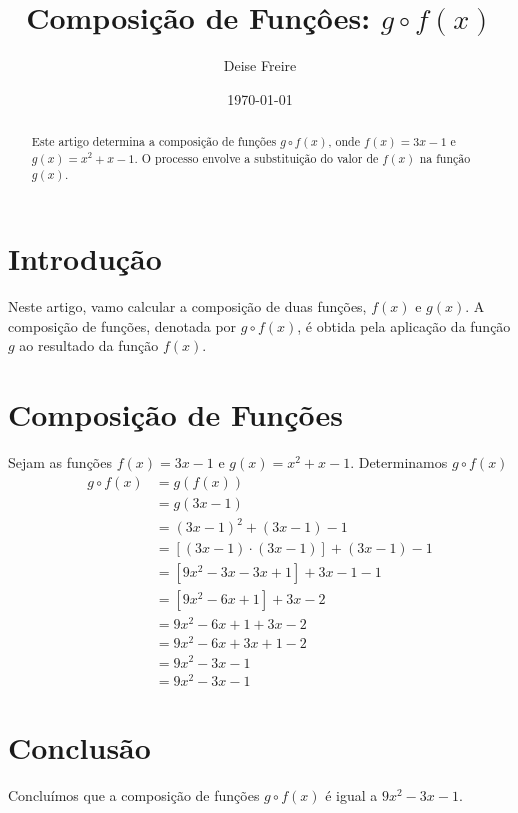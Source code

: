 \documentclass[12pt,a4paper]{article}
\begin{document}
\title{Composição de Funçôes: $g \circ f\left( x \right)$}
\author{Deise Freire}
\date{\today}
\maketitle
\begin{abstract}
    Este artigo determina a composição de funções $g \circ f\left( x \right)$, onde $f\left( x \right) = 3x - 1$ e $g\left( x \right) = x^{2} + x - 1$. O processo envolve a substituição do valor de $f\left( x \right)$ na função $g\left( x \right)$.
\end{abstract}
\section{Introdução}
Neste artigo, vamo calcular a composição de duas funções, $f\left( x \right)$ e $g\left( x \right)$. A composição de funções, denotada por $g \circ f\left( x \right)$, é obtida pela aplicação da função $g$ ao resultado da função $f\left( x \right)$.
\section{Composição de Funções}
Sejam as funções $f\left( x \right) = 3x - 1$ e $g\left( x \right) = x^{2} + x - 1$. Determinamos $g \circ f\left( x \right)$
\begin{align*}
    g \circ f\left( x \right) &= g\left( f\left( x \right) \right) \\
    &= g\left( 3x - 1 \right) \\
    &= \left( 3x - 1 \right)^{2} + \left( 3x - 1 \right) - 1 \\
    &= \left[ \left( 3x - 1 \right) \cdot \left( 3x - 1 \right) \right] + \left( 3x - 1 \right) - 1 \\
    &= \left[ 9x^{2} - 3x - 3x + 1 \right] + 3x - 1 - 1 \\
    &= \left[ 9x^{2} - 6x + 1 \right] + 3x - 2 \\
    &= 9x^{2} - 6x + 1 + 3x - 2 \\
    &= 9x^{2} - 6x + 3x + 1 - 2 \\
    &= 9x^{2} - 3x - 1 \\
    &= \boxed{9x^{2} - 3x - 1} 
\end{align*}
\section{Conclusão}
Concluímos que a composição de funções $g \circ f\left( x \right)$ é igual a $9x^{2} - 3x - 1$.
\end{document}
